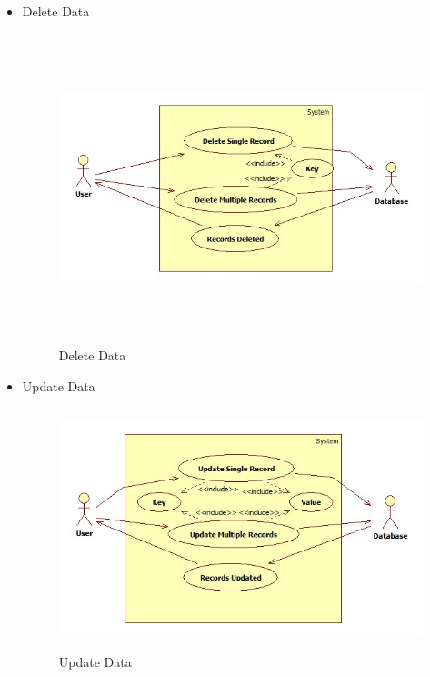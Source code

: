 \newpage
\begin{itemize}
  \item Delete Data
\begin{figure}[h]
\centering
  \includegraphics[width=11.5cm,height=9cm]{Fig4.jpg}
  \caption{Delete Data}\label{Delete Data}
\end{figure}
\end{itemize}

\begin{itemize}
  \item Update Data
\begin{figure}[h]
\centering
  \includegraphics[width=11.5cm,height=7cm]{Fig5.jpg}
  \caption{Update Data}\label{Update Data}
\end{figure}
\end{itemize}

